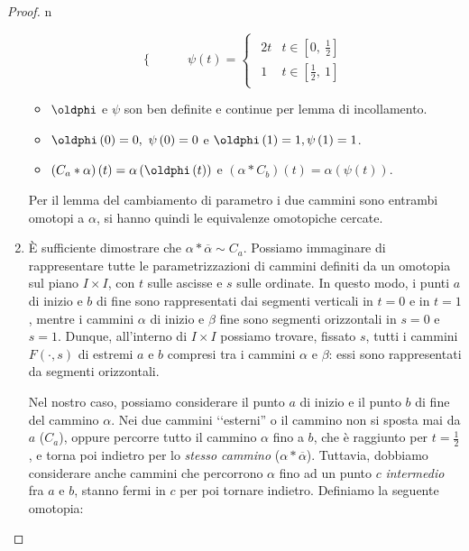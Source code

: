 \begin{proof}{n}
\begin{enumerate}[label=\Roman*]
\begin{equation*}
\begin{cases}
	\end{cases}
\qquad	\psi\left(t\right)=
\begin{cases}
	\begin{array}{ll}
		2t&t\in\left[0,\ \frac{1}{2}\right]\\
		1&t\in\left[\frac{1}{2},\ 1\right]
	\end{array}
\end{cases}
\end{equation*}
\begin{itemize}
	\item $\oldphi$ e $\psi$ son ben definite e continue per lemma di incollamento.
	\item $\oldphi\left(0\right)=0,\ \psi\left(0\right)=0$ e $\oldphi\left(1\right)=1,\psi\left(1\right)=1 $.
	\item $\left(C_a\ast \alpha\right)\left(t\right)=\alpha\left(\oldphi\left(t\right)\right)$ e $\left(\alpha\ast C_b\right)\left(t\right)=\alpha\left(\psi\left(t\right)\right)$.
\end{itemize}
Per il lemma del cambiamento di parametro i due cammini sono entrambi omotopi a $\alpha$, si hanno quindi le equivalenze omotopiche cercate.
\item È sufficiente dimostrare che $\alpha\ast\overline{\alpha}\sim C_a$. Possiamo immaginare di rappresentare tutte le parametrizzazioni di cammini definiti da un omotopia sul piano $I\times I$, con $t$ sulle ascisse e $s$ sulle ordinate. In questo modo, i punti $a$ di inizio e $b$ di fine sono rappresentati dai segmenti verticali in $t=0$ e in $t=1$, mentre i cammini $\alpha$ di inizio e $\beta$ fine sono segmenti orizzontali in $s=0$ e $s=1$. Dunque, all'interno di $I\times I$ possiamo  trovare, fissato $s$, tutti i cammini $F\left(\cdot,s\right)$ di estremi $a$ e $b$ compresi tra i cammini $\alpha$ e $\beta$: essi sono rappresentati da segmenti orizzontali.\\
\begin{minipage}{.62\linewidth}
Nel nostro caso, possiamo considerare il punto $a$ di inizio e il punto $b$ di fine del cammino $\alpha$. Nei due cammini ‘‘esterni'' o il cammino non si sposta mai da $a$ ($C_a$), oppure percorre tutto il cammino $\alpha$ fino a $b$, che è raggiunto per $t=\frac{1}{2}$, e torna poi indietro per lo \textit{stesso cammino} ($\alpha\ast\overline{\alpha}$). Tuttavia, dobbiamo considerare anche cammini che percorrono $\alpha$ fino ad un punto $c$ \textit{intermedio} fra $a$ e $b$, stanno fermi in $c$ per poi tornare indietro. Definiamo la seguente omotopia:
\end{minipage}

\end{enumerate}
\end{proof}
